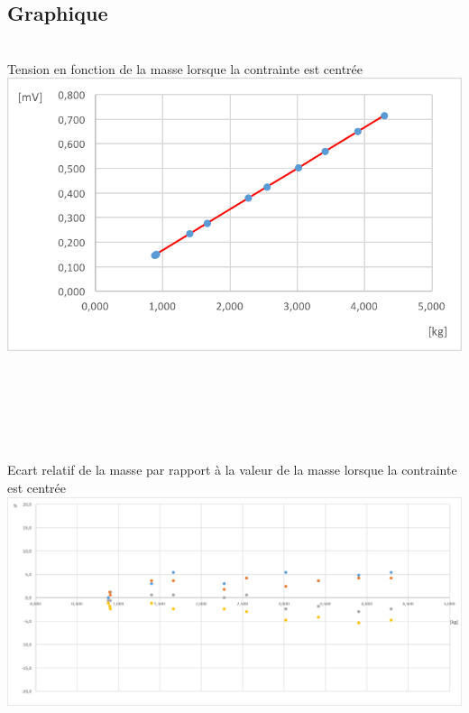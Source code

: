 \documentclass[10pt,a4paper]{report}
\begin{document}
\subsection*{Graphique}
\begin{center}
~\\
Tension en fonction de la masse lorsque la contrainte est centrée~\\
\includegraphics[scale=1]{Graphique1.png} ~\\~\\~\\~\\~\\~\\
Ecart relatif de la masse par rapport à la valeur de la masse lorsque la contrainte est centrée~\\
\includegraphics[scale=0.4]{Graphique2.png} ~\\
\end{center}
\newpage
\end{document}
